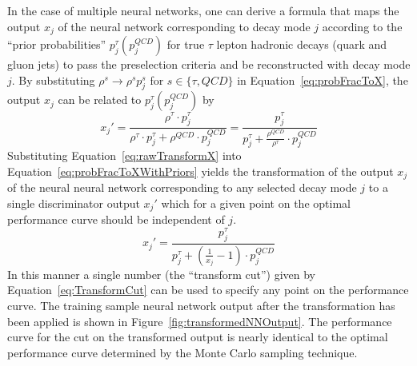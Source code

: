 In the case of multiple neural networks, one can derive a formula that maps the
output $x_j$ of the neural network corresponding to decay mode $j$ according to
the ``prior probabilities'' $p_j^\tau (p_j^{QCD})$ for true $\tau$ lepton
hadronic decays (quark and gluon jets) to pass the preselection criteria and
be reconstructed with decay mode $j$.
By substituting $\rho^s \rightarrow \rho^s p_j^s$ for $s \in \{\tau, QCD\}$ in
Equation~\ref{eq:probFracToX}, the output $x_j$ can be related to $p_j^\tau
(p_j^{QCD})$ by 
\begin{equation}
   x_j' = \frac{\rho^\tau \cdot p_j^\tau} 
   {\rho^\tau \cdot p_j^\tau + \rho^{QCD} \cdot p_j^{QCD} }
   = \frac{p_j^\tau} 
   {p_j^\tau + \frac{\rho^{QCD}}{\rho^\tau} \cdot p_j^{QCD} }
   \label{eq:probFracToXWithPriors}
\end{equation}
Substituting Equation~\ref{eq:rawTransformX} into
Equation~\ref{eq:probFracToXWithPriors} yields the transformation of the output
$x_j$ of the neural neural network corresponding to any selected decay mode $j$
to a single discriminator output $x_j'$ which for a given point on the optimal
performance curve should be independent of $j$.
\begin{equation}
   x_j' = \frac{p_j^\tau} 
   {p_j^\tau + \left(\frac{1}{x_j}-1\right)\cdot p_j^{QCD} }
   \label{eq:TransformCut}
\end{equation}
In this manner a single number (the ``transform cut'') given by
Equation~\ref{eq:TransformCut} can be used to specify any point on the
performance curve.  The training sample neural network output after the
transformation has been applied is shown in
Figure~\ref{fig:transformedNNOutput}.  The performance curve for the cut on the
transformed output is nearly identical to the optimal performance curve
determined by the Monte Carlo sampling technique. 

